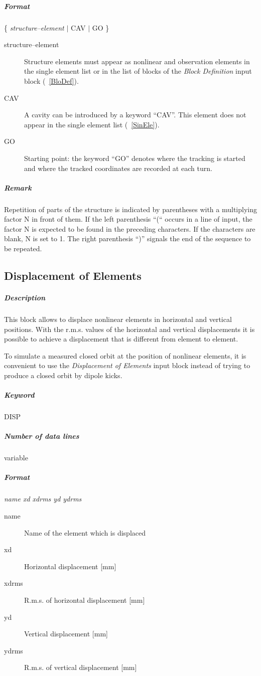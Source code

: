 \documentclass[a4paper,11pt]{report}
\begin{document}
\subparagraph{Format} \{ {\em structure--element} \/$\vert$ CAV
$\vert$ GO \}

\begin{description}
\item [structure--element] Structure elements must appear as nonlinear
  and observation elements in the single element list or in the list
  of blocks of the {\em Block Definition} \/input block
  (~\ref{BloDef}).
\item [CAV] A cavity can be introduced by a keyword ``CAV''.
  This element does not appear in the single element list
  (~\ref{SinEle}).
\item [GO] Starting point: the keyword ``GO'' denotes where the
  tracking is started and where the tracked coordinates are recorded
  at each turn.
\end{description}

\subparagraph{Remark} Repetition of parts of the structure is
indicated by parentheses with a multiplying factor N in front of them.
If the left parenthesis ``(`` occurs in a line of input, the factor N
is expected to be found in the preceding characters. If the characters
are blank, N is set to 1.  The right parenthesis ``)'' signals the end
of the sequence to be repeated.

\subsection{Displacement of Elements} \label{DisEle}

\subparagraph{Description} This block allows to displace nonlinear
elements in horizontal and vertical positions.  With the r.m.s. values of
the horizontal and vertical displacements it is possible to achieve a
displacement that is different from element to element.

To simulate a measured closed orbit at the position of nonlinear
elements, it is convenient to use the {\em Displacement of Elements}
\/input block instead of trying to produce a closed orbit by dipole
kicks.

\subparagraph{Keyword} DISP \subparagraph{Number of data lines}
variable

\subparagraph{Format} {\em name xd xdrms yd ydrms}

\begin{description}
\item [name] Name of the element which is displaced
\item [xd] Horizontal displacement [mm]
\item [xdrms] R.m.s. of horizontal displacement [mm]
\item [yd] Vertical displacement [mm]
\item [ydrms] R.m.s. of vertical displacement [mm]
\end{description}
\end{document}
